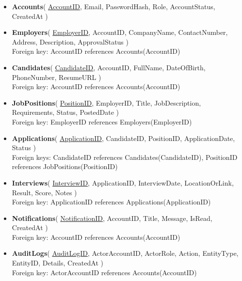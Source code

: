 \documentclass[11pt,a4paper]{report}
\begin{document}
\begin{itemize}
    \item \textbf{Accounts}(
    \underline{AccountID},
    Email,
    PasswordHash,
    Role,
    AccountStatus,
    CreatedAt
    )

    \item \textbf{Employers}(
    \underline{EmployerID},
    AccountID,
    CompanyName,
    ContactNumber,
    Address,
    Description,
    ApprovalStatus
    )\\
    Foreign key: AccountID references Accounts(AccountID)

    \item \textbf{Candidates}(
    \underline{CandidateID},
    AccountID,
    FullName,
    DateOfBirth,
    PhoneNumber,
    ResumeURL
    )\\
    Foreign key: AccountID references Accounts(AccountID)

    \item \textbf{JobPositions}(
    \underline{PositionID},
    EmployerID,
    Title,
    JobDescription,
    Requirements,
    Status,
    PostedDate
    )\\
    Foreign key: EmployerID references Employers(EmployerID)

    \item \textbf{Applications}(
    \underline{ApplicationID},
    CandidateID,
    PositionID,
    ApplicationDate,
    Status
    )\\
    Foreign keys: CandidateID references Candidates(CandidateID), PositionID references JobPositions(PositionID)

    \item \textbf{Interviews}(
    \underline{InterviewID},
    ApplicationID,
    InterviewDate,
    LocationOrLink,
    Result,
    Score,
    Notes
    )\\
    Foreign key: ApplicationID references Applications(ApplicationID)

    \item \textbf{Notifications}(
    \underline{NotificationID},
    AccountID,
    Title,
    Message,
    IsRead,
    CreatedAt
    )\\
    Foreign key: AccountID references Accounts(AccountID)

    \item \textbf{AuditLogs}(
    \underline{AuditLogID},
    ActorAccountID,
    ActorRole,
    Action,
    EntityType,
    EntityID,
    Details,
    CreatedAt
    )\\
    Foreign key: ActorAccountID references Accounts(AccountID)
\end{itemize}
\end{document}
